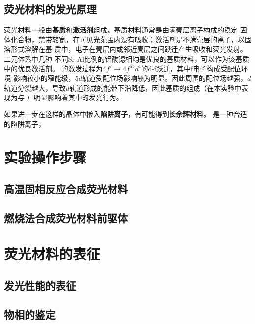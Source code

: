 \documentclass[a4paper,zihao=5,UTF8]{ctexart}
\begin{document}
	\subsection{荧光材料的发光原理}
	荧光材料一般由\textbf{基质}和\textbf{激活剂}组成。基质材料通常是由满壳层离子构成的稳定
	固体化合物，禁带较宽，在可见光范围内没有吸收；激活剂是不满壳层的离子，以固溶形式溶解在基
	质中，电子在壳层内或邻近壳层之间跃迁产生吸收和荧光发射。二元体系中几种
	不同Sr-Al比例的铝酸锶相均是优良的基质材料，可以作为该基质中的优良激活剂。
	的激发过程为$4f^7\to4f^ 65d ^1$的d-f跃迁，其中f电子构成受配位环境
	影响较小的窄能级，$5d$轨道受配位场影响较为明显。因此周围的配位场越强，$d$
	轨道分裂越大，导致$d$轨道形成的能带下沿降低，因此基质的组成（在本实验中表现为与
	）明显影响着其中的发光行为。
	\par 
	如果进一步在这样的晶体中掺入\textbf{陷阱离子}，有可能得到\textbf{长余辉材料}。
	是一种合适的陷阱离子，
	\section{实验操作步骤}
	\subsection{高温固相反应合成荧光材料}
	\subsection{燃烧法合成荧光材料前驱体}
	\section{荧光材料的表征}
	\subsection{发光性能的表征}
	\subsection{物相的鉴定}

	
	
	
\end{document}
